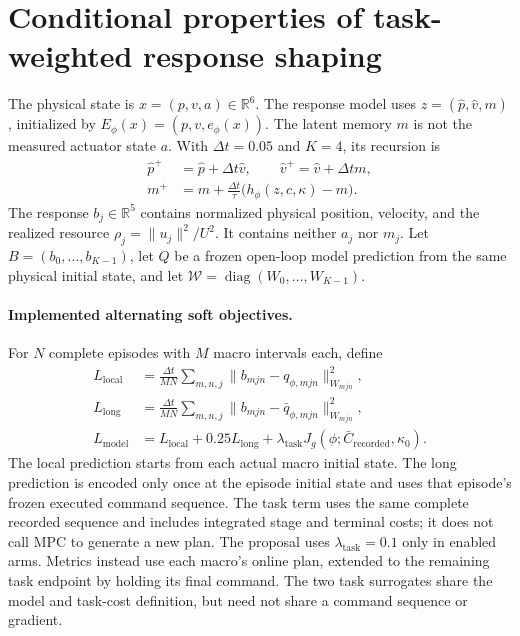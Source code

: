 
\section{Conditional properties of task-weighted response shaping}
\label{sec:task-response-theory}

The physical state is $x=(p,v,a)\in\mathbb R^6$. The response model uses
$z=(\hat p,\hat v,m)$, initialized by
$E_\phi(x)=(p,v,e_\phi(x))$. The latent memory $m$ is not the measured
actuator state $a$. With $\Delta t=0.05$ and $K=4$, its recursion is
\begin{align}
 \hat p^+&=\hat p+\Delta t\hat v,\qquad
 \hat v^+=\hat v+\Delta t m,\nonumber\\
 m^+&=m+\frac{\Delta t}{\tau}\bigl(h_\phi(z,c,\kappa)-m\bigr).
 \label{eq:tr-model}
\end{align}
The response $b_j\in\mathbb R^5$ contains normalized physical position,
velocity, and the realized resource $\rho_j=\|u_j\|^2/U^2$. It contains
neither $a_j$ nor $m_j$. Let $B=(b_0,\ldots,b_{K-1})$, let $Q$ be a
frozen open-loop model prediction from the same physical initial state,
and let $\mathcal W=\operatorname{diag}(W_0,\ldots,W_{K-1})$.

\paragraph{Implemented alternating soft objectives.}
For $N$ complete episodes with $M$ macro intervals each, define
\begin{align}
 L_{\mathrm{local}}&=\frac{\Delta t}{MN}\sum_{m,n,j}
       \|b_{mjn}-q_{\phi,mjn}\|_{W_{mjn}}^2,\nonumber\\
 L_{\mathrm{long}}&=\frac{\Delta t}{MN}\sum_{m,n,j}
       \|b_{mjn}-\bar q_{\phi,mjn}\|_{W_{mjn}}^2,\nonumber\\
 L_{\mathrm{model}}&=L_{\mathrm{local}}+0.25L_{\mathrm{long}}
       +\lambda_{\mathrm{task}}J_g(\phi;\bar C_{\mathrm{recorded}},\kappa_0).
 \label{eq:tr-model-objective}
\end{align}
The local prediction starts from each actual macro initial state. The
long prediction is encoded only once at the episode initial state and
uses that episode's frozen executed command sequence. The task term
uses the same complete recorded sequence and includes integrated stage
and terminal costs; it does not call MPC to generate a new plan.
The proposal uses $\lambda_{\mathrm{task}}=0.1$ only in enabled arms.
Metrics instead use each macro's online plan, extended to the remaining
task endpoint by holding its final command. The two task surrogates
share the model and task-cost definition, but need not share a command
sequence or gradient.

